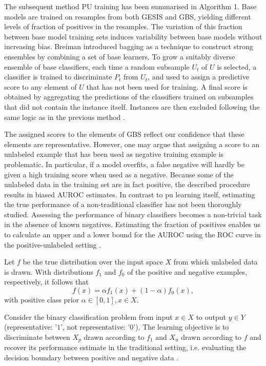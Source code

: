 The subsequent method PU training has been summarised in Algorithm 1. Base models are trained on resamples from both GESIS and GBS, yielding diﬀerent levels of fraction of positives in the resamples. The variation of this fraction between base model training sets induces variability between base models without increasing bias. Breiman \cite{leo} introduced bagging as a technique to construct strong ensembles by combining a set of base learners. To grow a suitably diverse ensemble of base classiﬁers, each time a random subsample \(U_t\) of \(U\) is selected, a classiﬁer is trained to discriminate \(P_t\) from \(U_t\), and used to assign a predictive score to any element of \(U\) that has not been used for training. A final score is obtained by aggregating the predictions of the classiﬁers trained on subsamples that did not contain the instance itself. Instances are then excluded following the same logic as in the previous method \cite{claesen2, jain2}.

The assigned scores to the elements of GBS reflect our confidence that these elements are representative. However, one may argue that assigning a score to an unlabeled example that has been used as negative training example is problematic. In particular, if a model overfits, a false negative will hardly be given a high training score when used as a negative. Because some of the unlabeled data in the training set are in fact positive, the described procedure results in biased AUROC estimates. In contrast to pu learning itself, estimating the true performance of a non-traditional classifier has not been thoroughly studied. Assessing the performance of binary classifiers becomes a non-trivial task in the absence of known negatives. Estimating the fraction of positives enables us to calculate an upper and a lower bound for the AUROC using the ROC curve in the positive-unlabeled setting \cite{claesen2, jain, jain2}.

Let \(f\) be the true distribution over the input space \(X\) from which unlabeled data is drawn. With distributions \(f_1\) and \(f_0\) of the positive and negative examples, respectively, it follows that \[f(x) = \alpha f_1(x) + (1-\alpha)f_0(x),\] with positive class prior \(\alpha \in [0,1], x \in X\).

Consider the binary classification problem from input \(x \in X\) to output \(y \in Y\) (representative: '\(1\)', not representative: '\(0\)'). The learning objective is to discriminate between \(X_p\) drawn according to \(f_1\) and \(X_u\) drawn according to \(f\)  and recover its performance estimate in the traditional setting, i.e. evaluating the decision boundary between positive and negative data \cite{jain}.

